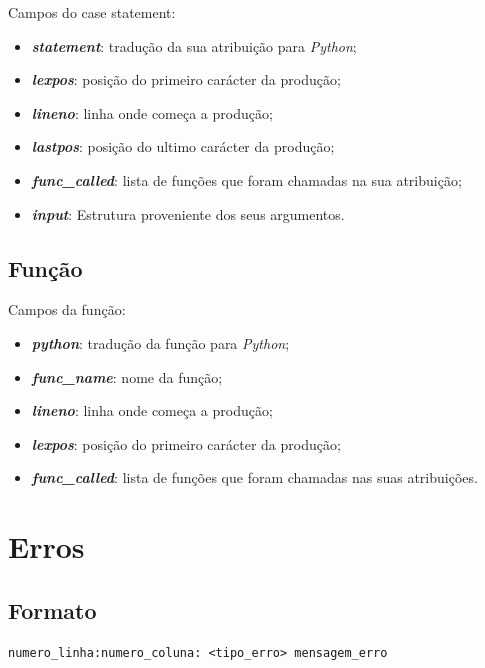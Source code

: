 \documentclass[11pt,a4paper]{report}
\begin{document}
Campos do case statement:
\begin{itemize}
    \item \textbf{\textit{statement}}: tradução da sua atribuição para \textit{Python}; 
    \item \textbf{\textit{lexpos}}: posição do primeiro carácter da produção;
    \item \textbf{\textit{lineno}}: linha onde começa a produção;
    \item \textbf{\textit{lastpos}}: posição do ultimo carácter da produção;
    \item \textbf{\textit{func\_called}}: lista de funções que foram chamadas na sua atribuição;
    \item \textbf{\textit{input}}: Estrutura proveniente dos seus argumentos.
    
\end{itemize} 

\section{Função}

Campos da função:
\begin{itemize}
    \item \textbf{\textit{python}}: tradução da função para \textit{Python};
    \item \textbf{\textit{func\_name}}: nome da função;
    \item \textbf{\textit{lineno}}: linha onde começa a produção;
    \item \textbf{\textit{lexpos}}: posição do primeiro carácter da produção;
    \item \textbf{\textit{func\_called}}: lista de funções que foram chamadas nas suas atribuições.
    
\end{itemize} 

\chapter{Erros}
\label{appendix:erros}

\section{Formato}
\begin{verbatim}
numero_linha:numero_coluna: <tipo_erro> mensagem_erro
\end{verbatim}
\end{document}
